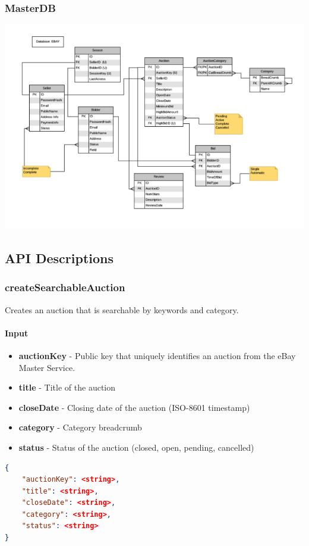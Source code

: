 \documentclass[12pt,a4paper]{article}
\begin{document}
\subsubsection{MasterDB}
\includegraphics[scale=0.5]{images/Screen Shot 2021-01-24 at 9.45.28 PM.png}
\pagebreak
\subsection{API Descriptions}

\subsubsection{createSearchableAuction}
\label{ref:csa}
Creates an auction that is searchable by keywords and category. 


\paragraph{Input}

\begin{itemize}
    \item \textbf{auctionKey} - Public key that uniquely identifies an auction from the eBay Master Service.
    \item \textbf{title} - Title of the auction 
    \item \textbf{closeDate} - Closing date of the auction (ISO-8601 timestamp)
    \item \textbf{category} - Category breadcrumb
    \item \textbf{status} - Status of the auction (closed, open, pending, cancelled)
\end{itemize}
\begin{lstlisting}[language=json,numbers=none]
{
    "auctionKey": <string>,
    "title": <string>,
    "closeDate": <string>,
    "category": <string>,
    "status": <string>
}
\end{lstlisting}
\end{document}
